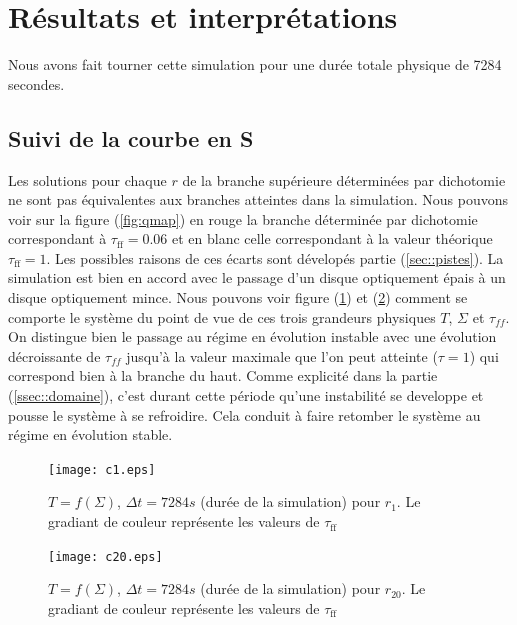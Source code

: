 \section{Résultats et interprétations}

Nous avons fait tourner cette simulation pour une durée totale physique de 7284 secondes.

\subsection{Suivi de la courbe en S}
Les solutions pour chaque $r$ de la branche supérieure déterminées par dichotomie ne sont pas équivalentes aux branches atteintes dans la simulation. Nous pouvons voir sur la figure (\ref{fig:qmap}) en rouge la branche déterminée par dichotomie correspondant à $\tau_\mathrm{ff} = 0.06 $ et en blanc celle correspondant à la valeur théorique $\tau_\mathrm{ff} = 1$. Les possibles raisons de ces écarts sont dévelopés partie (\ref{sec::pistes}). La simulation est bien en accord avec le passage d'un disque optiquement épais à un disque optiquement mince. Nous pouvons voir figure (\ref{fig:c1.eps}) et (\ref{fig:c20.eps}) comment se comporte le système du point de vue de ces trois grandeurs physiques $T$, $\Sigma$ et $\tau_{ff}$. On distingue bien le passage au régime en évolution instable avec une évolution décroissante de $\tau_{ff}$ jusqu'à la valeur maximale que l'on peut atteinte ($\tau = 1$) qui correspond bien à la branche du haut. Comme explicité dans la partie (\ref{ssec::domaine}), c'est durant cette période qu'une instabilité se developpe et pousse le système à se refroidire. Cela conduit à faire retomber le système au régime en évolution stable. \\
 

\begin{figure}
  \begin{center}
    \texttt{[image: c1.eps]}
  \end{center}
  \caption{$T=f(\Sigma)$, $\Delta t = 7284 s$ (durée de la simulation) pour $r_{1}$. Le gradiant de couleur représente les valeurs de $\tau_\mathrm{ff}$}
  \label{fig:c1.eps}
\end{figure} 

\begin{figure}
  \begin{center}
    \texttt{[image: c20.eps]}
  \end{center}
  \caption{$T=f(\Sigma)$, $\Delta t = 7284 s$ (durée de la simulation) pour $r_{20}$. Le gradiant de couleur représente les valeurs de $\tau_\mathrm{ff}$}
  \label{fig:c20.eps}
\end{figure}

